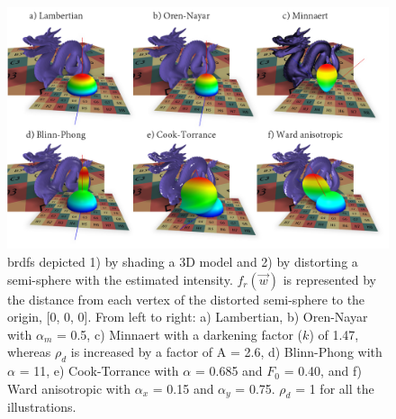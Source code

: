 \begin{figure}
    \centering
    \includegraphics[width=\linewidth]{figs/lidar_intensity/analytical_brdfs.png}
    \caption{\acrshort{brdf}s depicted 1) by shading a 3D model and 2) by distorting a semi-sphere with the estimated intensity. $f_{r}(\vec{w})$ is represented by the distance from each vertex of the distorted semi-sphere to the origin, [0, 0, 0]. From left to right: a) Lambertian, b) Oren-Nayar with $\alpha_{m}$ = 0.5, c) Minnaert with a darkening factor ($k$) of 1.47, whereas $\rho_{d}$ is increased by a factor of A = 2.6, d) Blinn-Phong with $\alpha$ = 11, e) Cook-Torrance with $\alpha$ = 0.685 and $F_{0}$ = 0.40, and f) Ward anisotropic with $\alpha_{x}$ = 0.15 and $\alpha_{y}$ = 0.75. $\rho_{d}$ = 1 for all the illustrations.  }
	\label{fig:lidar_analytical_brdfs}
\end{figure}

